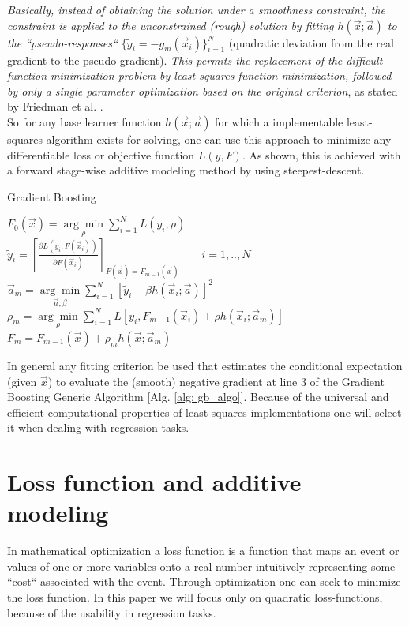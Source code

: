 \documentclass[12pt, a4paper]{article}
\begin{document}
\textit{Basically, instead of obtaining the solution under a smoothness constraint, the constraint is applied to the unconstrained (rough) solution by fitting $h(\vec{x};\vec{a})$ to the ``pseudo-responses`` $\{\tilde{y}_i = - g_m(\vec{x}_i)\}_{i=1}^N$} (quadratic deviation from the real gradient to the pseudo-gradient).
\textit{This permits the replacement of the difficult function minimization problem by least-squares function minimization, followed by only a single parameter optimization based on the original criterion}, as stated by Friedman et al. \cite{Friedman2001}.\\
So for any base learner function $h(\vec{x};\vec{a})$ for which a implementable least-squares algorithm exists for solving, one can use this approach to minimize any differentiable loss or objective function $L(y,F)$.
As shown, this is achieved with a forward stage-wise additive modeling method by using steepest-descent. 
\begin{algorithm}
\caption{Gradient Boosting}
\label{alg: gb_algo}
    $F_0(\vec{x}) = \underset{\rho}{\arg\min} \sum_{i=1}^N L(y_i,\rho)$ \\
    {$\tilde{y}_i = [\frac{\partial L(y_i, F(\vec{x}_i))}{\partial F(\vec{x}_i)}]_{F(\vec{x}) = F_{m-1}(\vec{x})} \qquad i = 1,..,N$
    $\vec{a}_m = \underset{ \vec{a}, \beta }{\arg\min} 
    \sum_{i=1}^N [\tilde{y}_i - \beta h(\vec{x}_i;\vec{a})]^2$
    $\rho_m = \underset{\rho}{\arg\min} \sum_{i=1}^N L[y_i,F_{m-1}(\vec{x}_i) + \rho h(\vec{x}_i;\vec{a}_m)]$
    $F_{m} = F_{m-1}(\vec{x}) + \rho_m h(\vec{x};\vec{a}_m)$
    }
\end{algorithm}
In general any fitting criterion be used that estimates the conditional expectation (given $\vec{x}$) to evaluate the (smooth) negative gradient at line 3 of the Gradient Boosting Generic Algorithm [Alg. \ref{alg: gb_algo}].
Because of the universal and efficient computational properties of least-squares implementations one will select it when dealing with regression tasks.
\newpage
\section{Loss function and additive modeling}
In mathematical optimization a loss function is a function that maps an event or values of one or more variables onto a real number intuitively representing some ``cost`` associated with the event. Through optimization one can seek to minimize the loss function. In this paper we will focus only on quadratic loss-functions, because of the usability in regression tasks.
\end{document}
